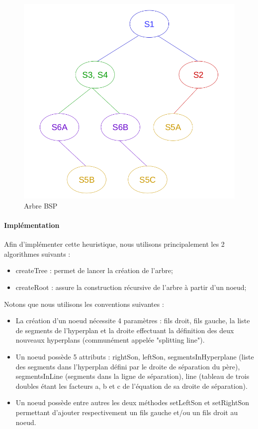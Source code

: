 \documentclass[11pt,a4paper]{article}
\begin{document}
\begin{figure}[!h]
\centering
\includegraphics[scale=0.35]{bsp_ex_3.png}
\caption{Arbre BSP}
\label{bsp_tree}
\end{figure}

\paragraph{Implémentation}

Afin d'implémenter cette heuristique, nous utilisons principalement les 2 algorithmes suivants :
\begin{itemize}
\item createTree : permet de lancer la création de l'arbre;
\item createRoot : assure la construction récursive de l'arbre à partir d'un noeud;
\end{itemize}

Notons que nous utilisons les conventions suivantes :
\begin{itemize}
\item La création d'un noeud nécessite 4 paramètres : fils droit, fils gauche, la liste de segments de l'hyperplan et la droite effectuant la définition des deux nouveaux hyperplans (communément appelée "splitting line").
\item Un noeud possède 5 attributs : rightSon, leftSon, segmentsInHyperplane (liste des segments dans l'hyperplan défini par le droite de séparation du père), segmentsInLine (segments dans la ligne de séparation), line (tableau de trois doubles étant les facteurs a, b et c de l'équation de sa droite de séparation).
\item Un noeud possède entre autres les deux méthodes setLeftSon et setRightSon permettant d'ajouter respectivement un fils gauche et/ou un fils droit au noeud. 
\end{itemize}
\end{document}
